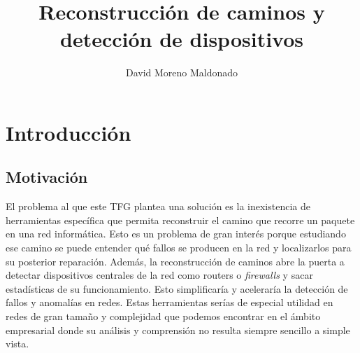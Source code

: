 \documentclass[tfg,epsbased,lof,lot,loa,final,nocopyright,overleaf]{tfgtfmthesisuam}
\title{Reconstrucción de caminos y detección de dispositivos}
\author{David Moreno Maldonado}
\begin{document}
\chapter{Introducción}

\section{Motivación}
El problema al que este TFG plantea una solución es la inexistencia de herramientas específica que permita reconstruir el camino que recorre un paquete en una red informática. Esto es un problema de gran interés porque estudiando ese camino se puede entender qué fallos se producen en la red y localizarlos para su posterior reparación. Además, la reconstrucción de caminos abre la puerta a detectar dispositivos centrales de la red como \glspl{router} o \textit{firewalls} y sacar estadísticas de su funcionamiento. Esto simplificaría y aceleraría la detección de fallos y anomalías en redes. Estas herramientas serías de especial utilidad en redes de gran tamaño y complejidad que podemos encontrar en el ámbito empresarial donde su análisis y comprensión no resulta siempre sencillo a simple vista.
\end{document}
